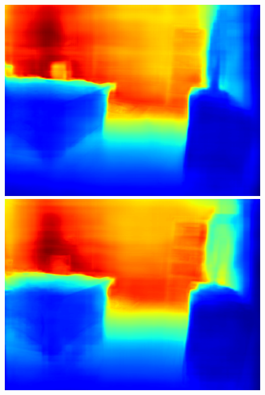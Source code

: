 \documentclass{svjour3}                     %
\begin{document}
\begin{figure}[t]
{\begin{minipage}[t]{0.15\linewidth}
  \includegraphics[width=1\linewidth]{images/nyu_result/bedroom_rgb_01149.png}
  \includegraphics[width=1\linewidth]{images/nyu_without/bedroom_rgb_01149.png}
  \end{minipage}%
  }
\end{figure}
\end{document}
